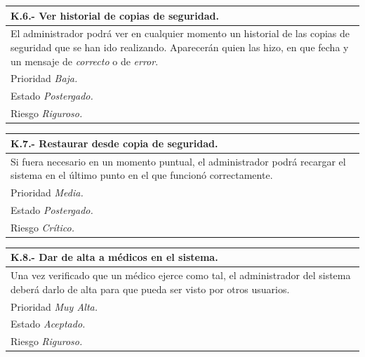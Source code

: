 \documentclass[a4paper,oneside,11pt]{book}
\begin{document}
\begin{center}
\begin{tabulary}{15cm}{|L|}
	\hline
		\bf{K.6.- Ver historial de copias de seguridad.} \\
	\hline
		El administrador podrá ver en cualquier momento un  historial de las copias de seguridad que se han ido realizando. Aparecerán quien las hizo, en que fecha y un mensaje de \textit{correcto} o de \textit{error}. \\
	\hline
		Prioridad \textit{Baja.} \\
	\hline
		Estado \textit{Postergado.} \\
	\hline
		Riesgo \textit{Riguroso.} \\
	\hline
\end{tabulary}
\end{center}

\begin{center}
\begin{tabulary}{15cm}{|L|}
	\hline
		\bf{K.7.- Restaurar desde copia de seguridad.} \\
	\hline
		Si fuera necesario en un momento puntual, el administrador podrá recargar el sistema en el último punto en el que funcionó correctamente. \\
	\hline
		Prioridad \textit{Media.} \\
	\hline
		Estado \textit{Postergado.} \\
	\hline
		Riesgo \textit{Crítico.} \\
	\hline
\end{tabulary}
\end{center}

\begin{center}
\begin{tabulary}{15cm}{|L|}
	\hline
		\bf{K.8.- Dar de alta a médicos en el sistema.} \\
	\hline
		Una vez verificado que un médico ejerce como tal, el administrador del sistema deberá darlo de alta para que pueda ser visto por otros usuarios. \\
	\hline
		Prioridad \textit{Muy Alta.} \\
	\hline
		Estado \textit{Aceptado.} \\
	\hline
		Riesgo \textit{Riguroso.} \\
	\hline
\end{tabulary}
\end{center}
\end{document}
